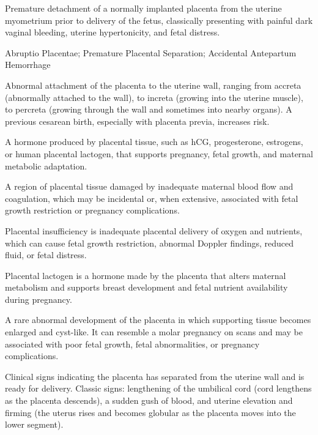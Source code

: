  Premature detachment of a normally implanted placenta from the uterine myometrium prior to delivery of the fetus, classically presenting with painful dark vaginal bleeding, uterine hypertonicity, and fetal distress.

\synonyms
Abruptio Placentae; Premature Placental Separation; Accidental Antepartum Hemorrhage

 Abnormal attachment of the placenta to the uterine wall, ranging from accreta (abnormally attached to the wall), to increta (growing into the uterine muscle), to percreta (growing through the wall and sometimes into nearby organs). A previous cesarean birth, especially with placenta previa, increases risk.

 A hormone produced by placental tissue, such as hCG, progesterone, estrogens, or human placental lactogen, that supports pregnancy, fetal growth, and maternal metabolic adaptation.

 A region of placental tissue damaged by inadequate maternal blood flow and coagulation, which may be incidental or, when extensive, associated with fetal growth restriction or pregnancy complications.

 Placental insufficiency is inadequate placental delivery of oxygen and nutrients, which can cause fetal growth restriction, abnormal Doppler findings, reduced fluid, or fetal distress.

 Placental lactogen is a hormone made by the placenta that alters maternal metabolism and supports breast development and fetal nutrient availability during pregnancy.

 A rare abnormal development of the placenta in which supporting tissue becomes enlarged and cyst-like. It can resemble a molar pregnancy on scans and may be associated with poor fetal growth, fetal abnormalities, or pregnancy complications.

 Clinical signs indicating the placenta has separated from the uterine wall and is ready
for delivery. Classic signs: lengthening of the umbilical cord (cord lengthens as the
placenta descends), a sudden gush of blood, and uterine elevation and firming (the
uterus rises and becomes globular as the placenta moves into the lower segment).

